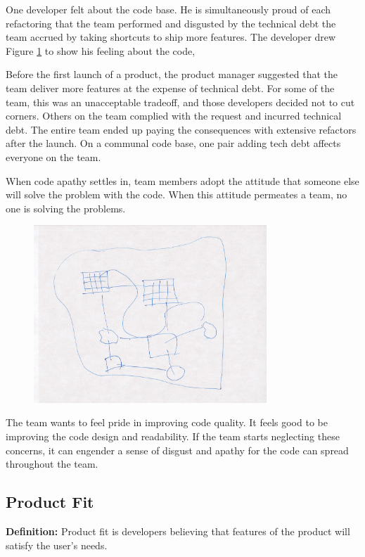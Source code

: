 One developer felt  about the code base. He is simultaneously proud of each refactoring that the team performed and disgusted by the technical debt the team accrued by taking shortcuts to ship more features. The developer drew Figure \ref{Programmer1} to show his feeling about the code, 

Before the first launch of a product, the product manager suggested that the team deliver more features at the expense of technical debt. For some of the team, this was an unacceptable tradeoff, and those developers decided not to cut corners. Others on the team complied with the request and incurred technical debt. The entire team ended up paying the consequences with extensive refactors after the launch. On a communal code base, one pair adding tech debt affects everyone on the team.

When code apathy settles in, team members adopt the attitude that someone else will solve the problem with the code. When this attitude permeates a team, no one is solving the problems. 

\begin{figure}[t]
\centering
\includegraphics[width=3.45in]{team_code_ownership_images/CodeOwnership.jpg}
\caption{}
\label{Programmer1}
\end{figure}

The team wants to feel pride in improving code quality.  It feels good to be improving the code design and readability. If the team starts neglecting these concerns, it can engender a sense of disgust and apathy for the code can spread throughout the team.

\subsection{Product Fit}
\textbf{Definition:} Product fit is developers believing that features of the product will satisfy the user's needs.

